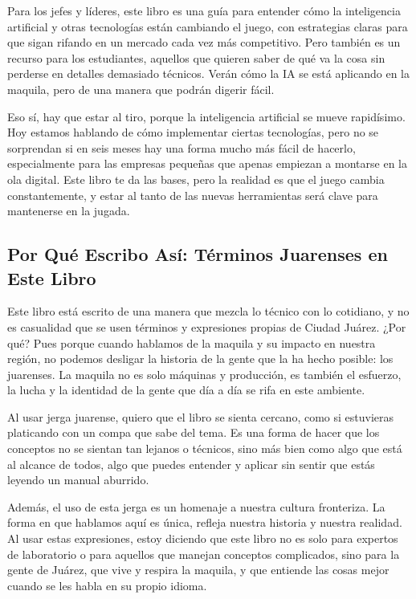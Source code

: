 \documentclass[
  10pt,
  letterpaper,
]{book}
\begin{document}
Para los jefes y líderes, este libro es una guía para entender cómo la
inteligencia artificial y otras tecnologías están cambiando el juego,
con estrategias claras para que sigan rifando en un mercado cada vez más
competitivo. Pero también es un recurso para los estudiantes, aquellos
que quieren saber de qué va la cosa sin perderse en detalles demasiado
técnicos. Verán cómo la IA se está aplicando en la maquila, pero de una
manera que podrán digerir fácil.

Eso sí, hay que estar al tiro, porque la inteligencia artificial se
mueve rapidísimo. Hoy estamos hablando de cómo implementar ciertas
tecnologías, pero no se sorprendan si en seis meses hay una forma mucho
más fácil de hacerlo, especialmente para las empresas pequeñas que
apenas empiezan a montarse en la ola digital. Este libro te da las
bases, pero la realidad es que el juego cambia constantemente, y estar
al tanto de las nuevas herramientas será clave para mantenerse en la
jugada.

\subsection*{Por Qué Escribo Así: Términos Juarenses en Este
Libro}\label{por-quuxe9-escribo-asuxed-tuxe9rminos-juarenses-en-este-libro}

Este libro está escrito de una manera que mezcla lo técnico con lo
cotidiano, y no es casualidad que se usen términos y expresiones propias
de Ciudad Juárez. ¿Por qué? Pues porque cuando hablamos de la maquila y
su impacto en nuestra región, no podemos desligar la historia de la
gente que la ha hecho posible: los juarenses. La maquila no es solo
máquinas y producción, es también el esfuerzo, la lucha y la identidad
de la gente que día a día se rifa en este ambiente.

Al usar jerga juarense, quiero que el libro se sienta cercano, como si
estuvieras platicando con un compa que sabe del tema. Es una forma de
hacer que los conceptos no se sientan tan lejanos o técnicos, sino más
bien como algo que está al alcance de todos, algo que puedes entender y
aplicar sin sentir que estás leyendo un manual aburrido.

Además, el uso de esta jerga es un homenaje a nuestra cultura
fronteriza. La forma en que hablamos aquí es única, refleja nuestra
historia y nuestra realidad. Al usar estas expresiones, estoy diciendo
que este libro no es solo para expertos de laboratorio o para aquellos
que manejan conceptos complicados, sino para la gente de Juárez, que
vive y respira la maquila, y que entiende las cosas mejor cuando se les
habla en su propio idioma.
\end{document}
